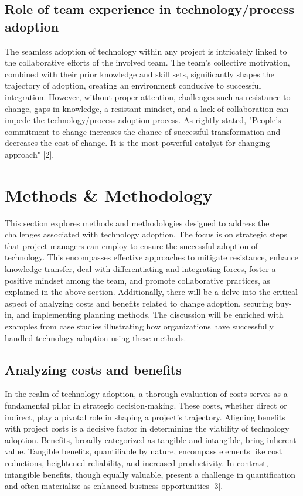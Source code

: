 \documentclass{article}
\begin{document}
\subsection{Role of team experience in technology/process adoption}

The seamless adoption of technology within any project is intricately linked to the collaborative efforts of the involved team. The team's collective motivation, combined with their prior knowledge and skill sets, significantly shapes the trajectory of adoption, creating an environment conducive to successful integration. However, without proper attention, challenges such as resistance to change, gaps in knowledge, a resistant mindset, and a lack of collaboration can impede the technology/process adoption process. As rightly stated, "People's commitment to change increases the chance of successful transformation and decreases the cost of change. It is the most powerful catalyst for changing approach" [2].


\section{Methods \& Methodology}
This section explores methods and methodologies designed to address the challenges associated with technology adoption. The focus is on strategic steps that project managers can employ to ensure the successful adoption of technology. This encompasses effective approaches to mitigate resistance, enhance knowledge transfer, deal with differentiating and integrating forces, foster a positive mindset among the team, and promote collaborative practices, as explained in the above section. Additionally, there will be a delve into the critical aspect of analyzing costs and benefits related to change adoption, securing buy-in, and implementing planning methods. The discussion will be enriched with examples from case studies illustrating how organizations have successfully handled technology adoption using these methods.


\subsection{Analyzing costs and benefits}
In the realm of technology adoption, a thorough evaluation of costs serves as a fundamental pillar in strategic decision-making. These costs, whether direct or indirect, play a pivotal role in shaping a project's trajectory. Aligning benefits with project costs is a decisive factor in determining the viability of technology adoption. Benefits, broadly categorized as tangible and intangible, bring inherent value. Tangible benefits, quantifiable by nature, encompass elements like cost reductions, heightened reliability, and increased productivity. In contrast, intangible benefits, though equally valuable, present a challenge in quantification and often materialize as enhanced business opportunities [3].
\end{document}
